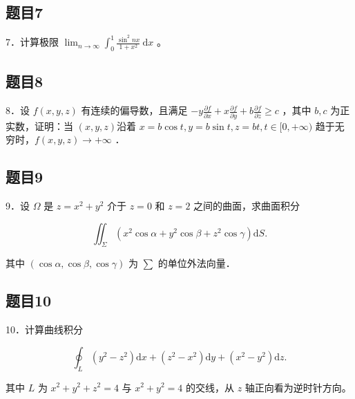 \documentclass{article}
\begin{document}
\subsection{题目7}
7．计算极限 \(\lim _{n \rightarrow \infty} \int_{0}^{1} \frac{\sin ^{2} n x}{1+x^{2}} \mathrm{~d} x\) 。

\subsection{题目8}
8．设 \(f(x, y, z)\) 有连续的偏导数，且满足 \(-y \frac{\partial f}{\partial x}+x \frac{\partial f}{\partial y}+b \frac{\partial f}{\partial z} \geq c\) ，其中 \(b, c\) 为正实数，证明：当 \((x, y, z)\)沿着 \(x=b \cos t, y=b \sin t, z=b t, t \in[0,+\infty)\) 趋于无穷时，\(f(x, y, z) \rightarrow+\infty\) ．

\subsection{题目9}
9．设 \(\Omega\) 是 \(z=x^{2}+y^{2}\) 介于 \(z=0\) 和 \(z=2\) 之间的曲面，求曲面积分

\[
\iint_{\Sigma}\left(x^{2} \cos \alpha+y^{2} \cos \beta+z^{2} \cos \gamma\right) \mathrm{d} S .
\]

其中 \((\cos \alpha, \cos \beta, \cos \gamma)\) 为 \(\sum\) 的单位外法向量．

\subsection{题目10}
10．计算曲线积分

\[
\oint_{L}\left(y^{2}-z^{2}\right) \mathrm{d} x+\left(z^{2}-x^{2}\right) \mathrm{d} y+\left(x^{2}-y^{2}\right) \mathrm{d} z .
\]

其中 \(L\) 为 \(x^{2}+y^{2}+z^{2}=4\) 与 \(x^{2}+y^{2}=4\) 的交线，从 \(z\) 轴正向看为逆时针方向。
\end{document}
